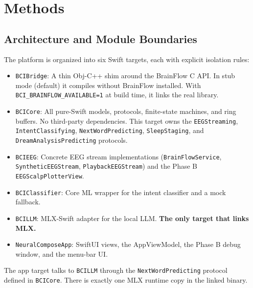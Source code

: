 \section{Methods}
\label{sec:methods}


\subsection{Architecture and Module Boundaries}

The platform is organized into six Swift targets, each with explicit
isolation rules:

\begin{itemize}
\item \texttt{BCIBridge}: A thin Obj-C++ shim around the BrainFlow C API. In stub mode (default) it compiles without BrainFlow installed. With \texttt{BCI\_BRAINFLOW\_AVAILABLE=1} at build time, it links the real library.
\item \texttt{BCICore}: All pure-Swift models, protocols, finite-state machines, and ring buffers. No third-party dependencies. This target owns the \texttt{EEGStreaming}, \texttt{IntentClassifying}, \texttt{NextWordPredicting}, \texttt{SleepStaging}, and \texttt{DreamAnalysisPredicting} protocols.
\item \texttt{BCIEEG}: Concrete EEG stream implementations (\texttt{BrainFlowService}, \texttt{SyntheticEEGStream}, \texttt{PlaybackEEGStream}) and the Phase B \texttt{EEGScalpPlotterView}.
\item \texttt{BCIClassifier}: Core ML wrapper for the intent classifier and a mock fallback.
\item \texttt{BCILLM}: MLX-Swift adapter for the local LLM. \textbf{The only target that links MLX.}
\item \texttt{NeuralComposeApp}: SwiftUI views, the AppViewModel, the Phase B debug window, and the menu-bar UI.
\end{itemize}

The app target talks to \texttt{BCILLM} through the \texttt{NextWordPredicting} protocol defined in \texttt{BCICore}. There is exactly one MLX runtime copy in the linked binary.


